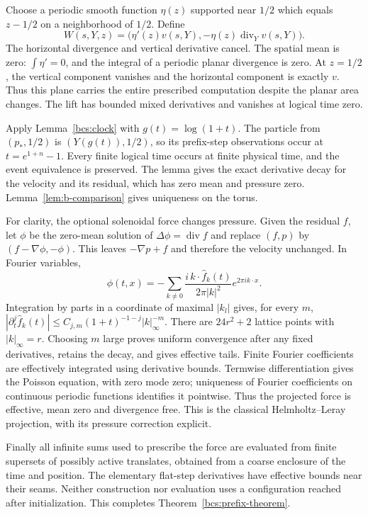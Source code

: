Choose a periodic smooth function $\eta(z)$ supported near $1/2$ which equals $z-1/2$ on a neighborhood of $1/2$. Define
\begin{equation}\label{bcs:prefix-lift}
 W(s,Y,z)=\bigl(\eta'(z)v(s,Y),-\eta(z)\operatorname{div}_Yv(s,Y)\bigr).
\end{equation}
The horizontal divergence and vertical derivative cancel. The spatial mean is zero: $\int\eta'=0$, and the integral of a periodic planar divergence is zero. At $z=1/2$, the vertical component vanishes and the horizontal component is exactly $v$. Thus this plane carries the entire prescribed computation despite the planar area changes. The lift has bounded mixed derivatives and vanishes at logical time zero.

Apply Lemma~\ref{bcs:clock} with $g(t)=\log(1+t)$. The particle from $(p_*,1/2)$ is $(Y(g(t)),1/2)$, so its prefix-step observations occur at $t=e^{1+n}-1$. Every finite logical time occurs at finite physical time, and the event equivalence is preserved. The lemma gives the exact derivative decay for the velocity and its residual, which has zero mean and pressure zero. Lemma~\ref{lem:b-comparison} gives uniqueness on the torus.

For clarity, the optional solenoidal force changes pressure. Given the residual $f$, let $\phi$ be the zero-mean solution of $\Delta\phi=\operatorname{div}f$ and replace $(f,p)$ by $(f-\nabla\phi,-\phi)$. This leaves $-\nabla p+f$ and therefore the velocity unchanged. In Fourier variables,
\[
 \phi(t,x)=-\sum_{k\ne0}\frac{i\,k\cdot\widehat f_k(t)}{2\pi|k|^2}e^{2\pi i k\cdot x}.
\]
Integration by parts in a coordinate of maximal $|k_l|$ gives, for every $m$,
$|\partial_t^j\widehat f_k(t)|\le C_{j,m}(1+t)^{-1-j}|k|_\infty^{-m}$.
There are $24r^2+2$ lattice points with $|k|_\infty=r$. Choosing $m$ large proves uniform convergence after any fixed derivatives, retains the decay, and gives effective tails. Finite Fourier coefficients are effectively integrated using derivative bounds. Termwise differentiation gives the Poisson equation, with zero mode zero; uniqueness of Fourier coefficients on continuous periodic functions identifies it pointwise. Thus the projected force is effective, mean zero and divergence free. This is the classical Helmholtz--Leray projection, with its pressure correction explicit.

Finally all infinite sums used to prescribe the force are evaluated from finite supersets of possibly active translates, obtained from a coarse enclosure of the time and position. The elementary flat-step derivatives have effective bounds near their seams. Neither construction nor evaluation uses a configuration reached after initialization. This completes Theorem~\ref{bcs:prefix-theorem}.

